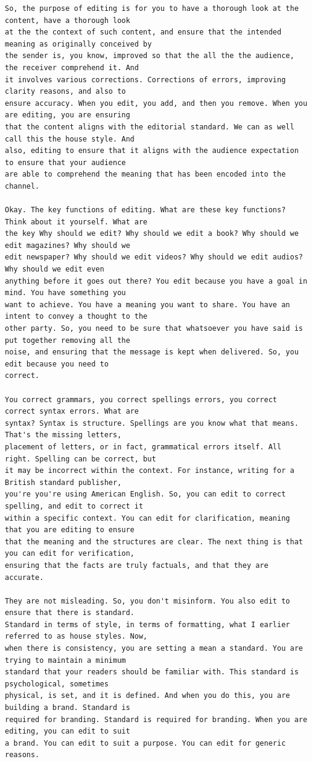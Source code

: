 {\begin{Verbatim}
So, the purpose of editing is for you to have a thorough look at the content, have a thorough look
at the the context of such content, and ensure that the intended meaning as originally conceived by
the sender is, you know, improved so that the all the the audience, the receiver comprehend it. And
it involves various corrections. Corrections of errors, improving clarity reasons, and also to
ensure accuracy. When you edit, you add, and then you remove. When you are editing, you are ensuring
that the content aligns with the editorial standard. We can as well call this the house style. And
also, editing to ensure that it aligns with the audience expectation to ensure that your audience
are able to comprehend the meaning that has been encoded into the channel.

Okay. The key functions of editing. What are these key functions? Think about it yourself. What are
the key Why should we edit? Why should we edit a book? Why should we edit magazines? Why should we
edit newspaper? Why should we edit videos? Why should we edit audios? Why should we edit even
anything before it goes out there? You edit because you have a goal in mind. You have something you
want to achieve. You have a meaning you want to share. You have an intent to convey a thought to the
other party. So, you need to be sure that whatsoever you have said is put together removing all the
noise, and ensuring that the message is kept when delivered. So, you edit because you need to
correct.

You correct grammars, you correct spellings errors, you correct correct syntax errors. What are
syntax? Syntax is structure. Spellings are you know what that means. That's the missing letters,
placement of letters, or in fact, grammatical errors itself. All right. Spelling can be correct, but
it may be incorrect within the context. For instance, writing for a British standard publisher,
you're you're using American English. So, you can edit to correct spelling, and edit to correct it
within a specific context. You can edit for clarification, meaning that you are editing to ensure
that the meaning and the structures are clear. The next thing is that you can edit for verification,
ensuring that the facts are truly factuals, and that they are accurate.

They are not misleading. So, you don't misinform. You also edit to ensure that there is standard.
Standard in terms of style, in terms of formatting, what I earlier referred to as house styles. Now,
when there is consistency, you are setting a mean a standard. You are trying to maintain a minimum
standard that your readers should be familiar with. This standard is psychological, sometimes
physical, is set, and it is defined. And when you do this, you are building a brand. Standard is
required for branding. Standard is required for branding. When you are editing, you can edit to suit
a brand. You can edit to suit a purpose. You can edit for generic reasons.


\end{Verbatim}}
